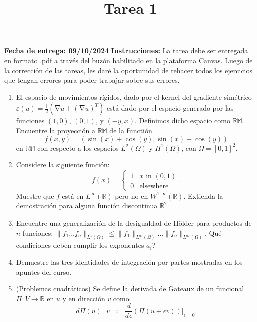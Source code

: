 \documentclass{article}
\title{Tarea 1}
\date{}
\DeclareMathOperator{\grad}{\nabla}
\newcommand{\R}{\mathbb{R}}
\begin{document}
\maketitle
\hfill \textbf{Fecha de entrega: 09/10/2024}
\textbf{Instrucciones: } La tarea debe ser entregada en formato .pdf a través del buzón habilitado en la plataforma Canvas. Luego de la corrección de las tareas, les daré la oportunidad de rehacer todos los ejercicios que tengan errores para poder trabajar sobre sus errores.

\begin{enumerate}
    \item El espacio de movimientos rígidos, dado por el kernel del gradiente simétrico $\varepsilon(u) = \frac 1 2 \left( \grad u + (\grad u)^T \right)$ está dado por el espacio generado por las funciones $(1,0)$, $(0,1)$, y $(-y, x)$. Definimos dicho espacio como $\mathbb{RM}$. Encuentre la proyección a $\mathbb{RM}$ de la functión 
        $$ f(x,y) = (\sin(x) + \cos(y), \sin(x) - \cos(y)) $$
    en $\mathbb{RM}$ con respecto a los espacios $L^2(\Omega)$ y $H^1(\Omega)$, con $\Omega=[0,1]^2$.
    \item Considere la siguiente función: 
        $$ f(x) = \begin{cases}
                        1 & \text{$x$ in $(0,1)$} \\
                        0 & \text{elsewhere}
                    \end{cases}. $$
    Muestre que $f$ está en $L^\infty(\R)$ pero no en $W^{1,\infty}(\R)$. Extienda la demostración para alguna función discontinua $\R^2$. 
    \item Encuentre una generalización de la desigualdad de Hölder para productos de $n$ funciones: $\| f_1 \hdots f_n \|_{L^1(\Omega)} \leq \| f_1\|_{L^{a_1}(\Omega)} \hdots \| f_n \|_{L^{a_n}(\Omega)}$. Qué condiciones deben cumplir los exponentes $a_i$? 
    \item Demuestre las tres identidades de integración por partes mostradas en los apuntes del curso.
    \item (Problemas cuadráticos) Se define la derivada de Gateaux de un funcional $\Pi: V \to \R$ en $u$ y en dirección $v$ como
        $$ d\Pi(u)[v] \coloneqq \frac{d}{d\epsilon}\left.\left(\Pi(u + \epsilon v) \right)\right|_{\epsilon=0}. $$

\end{enumerate}
\end{document}
